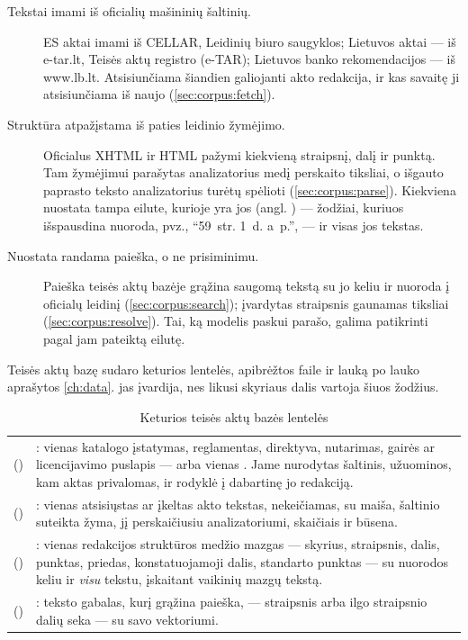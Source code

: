 \begin{description}
  \item[Tekstai imami iš oficialių mašininių šaltinių.] ES aktai imami iš CELLAR, Leidinių
    biuro saugyklos; Lietuvos aktai --- iš e-tar.lt, Teisės aktų registro (e-TAR); Lietuvos
    banko rekomendacijos --- iš www.lb.lt. Atsisiunčiama šiandien galiojanti akto
    redakcija, ir kas savaitę ji atsisiunčiama iš naujo (\cref{sec:corpus:fetch}).
  \item[Struktūra atpažįstama iš paties leidinio žymėjimo.] Oficialus XHTML ir HTML pažymi
    kiekvieną straipsnį, dalį ir punktą. Tam žymėjimui parašytas analizatorius medį perskaito
    tiksliai, o išgauto paprasto teksto analizatorius turėtų spėlioti
    (\cref{sec:corpus:parse}). Kiekviena nuostata tampa eilute, kurioje yra jos
     (angl. ) --- žodžiai, kuriuos išspausdina nuoroda,
    pvz., \enquote{59~str. 1~d. a~p.}, --- ir visas jos tekstas.
  \item[Nuostata randama paieška, o ne prisiminimu.] Paieška teisės aktų bazėje grąžina
    saugomą tekstą su jo keliu ir nuoroda į oficialų leidinį (\cref{sec:corpus:search});
    įvardytas straipsnis gaunamas tiksliai (\cref{sec:corpus:resolve}). Tai, ką modelis
    paskui parašo, galima patikrinti pagal jam pateiktą eilutę.
\end{description}

Teisės aktų bazę sudaro keturios lentelės, apibrėžtos faile  ir lauką po lauko
aprašytos \cref{ch:data}.  jas įvardija, nes likusi skyriaus dalis
vartoja šiuos žodžius.

\begin{table}[H]
\caption{Keturios teisės aktų bazės lentelės}\label{tab:corpus:tables}
\begin{tabularx}{\textwidth}{@{}L{44mm}Y@{}}
\toprule
{} &  \\
\midrule
{} () & : vienas katalogo įstatymas, reglamentas, direktyva, nutarimas, gairės ar licencijavimo puslapis --- arba vienas . Jame nurodytas šaltinis, užuominos, kam aktas privalomas, ir rodyklė į dabartinę jo redakciją. \\
 () & : vienas atsisiųstas ar įkeltas akto tekstas, nekeičiamas, su maiša, šaltinio suteikta žyma, jį perskaičiusiu analizatoriumi, skaičiais ir būsena. \\
 () & : vienas redakcijos struktūros medžio mazgas --- skyrius, straipsnis, dalis, punktas, priedas, konstatuojamoji dalis, standarto punktas --- su nuorodos keliu ir \emph{visu} tekstu, įskaitant vaikinių mazgų tekstą. \\
 () & : teksto gabalas, kurį grąžina paieška, --- straipsnis arba ilgo straipsnio dalių seka --- su savo vektoriumi. \\
\bottomrule
\end{tabularx}
\end{table}

